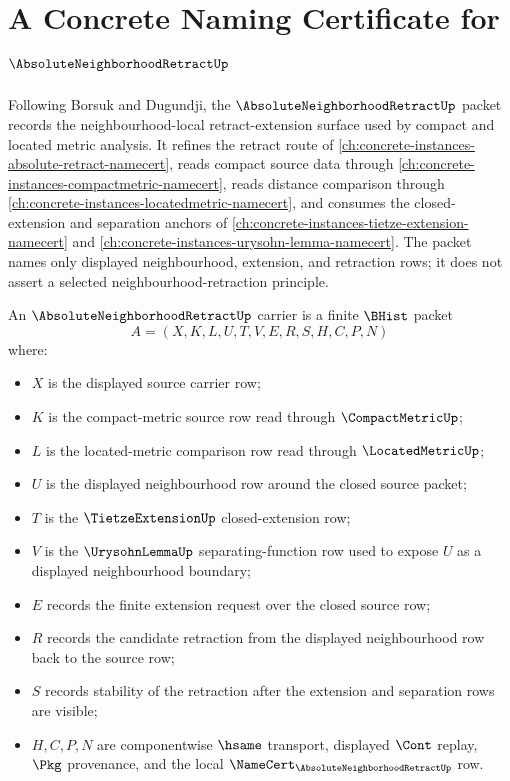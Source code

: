 \chapter{A Concrete Naming Certificate for $\AbsoluteNeighborhoodRetractUp$}
\label{ch:concrete-instances-absolute-neighborhood-retract-namecert}

Following Borsuk and Dugundji, the $\AbsoluteNeighborhoodRetractUp$ packet records the neighbourhood-local retract-extension surface used by compact and located metric analysis. It refines the retract route of \autoref{ch:concrete-instances-absolute-retract-namecert}, reads compact source data through \autoref{ch:concrete-instances-compactmetric-namecert}, reads distance comparison through \autoref{ch:concrete-instances-locatedmetric-namecert}, and consumes the closed-extension and separation anchors of \autoref{ch:concrete-instances-tietze-extension-namecert} and \autoref{ch:concrete-instances-urysohn-lemma-namecert}. The packet names only displayed neighbourhood, extension, and retraction rows; it does not assert a selected neighbourhood-retraction principle.

\begin{definition}\label{def:absolute-neighborhood-retract-carrier}
An $\AbsoluteNeighborhoodRetractUp$ carrier is a finite $\BHist$ packet
$$
A=(X,K,L,U,T,V,E,R,S,H,C,P,N)
$$
where:
\begin{itemize}
\item $X$ is the displayed source carrier row;
\item $K$ is the compact-metric source row read through $\CompactMetricUp$;
\item $L$ is the located-metric comparison row read through $\LocatedMetricUp$;
\item $U$ is the displayed neighbourhood row around the closed source packet;
\item $T$ is the $\TietzeExtensionUp$ closed-extension row;
\item $V$ is the $\UrysohnLemmaUp$ separating-function row used to expose $U$ as a displayed neighbourhood boundary;
\item $E$ records the finite extension request over the closed source row;
\item $R$ records the candidate retraction from the displayed neighbourhood row back to the source row;
\item $S$ records stability of the retraction after the extension and separation rows are visible;
\item $H,C,P,N$ are componentwise $\hsame$ transport, displayed $\Cont$ replay, $\Pkg$ provenance, and the local $\NameCert_{\AbsoluteNeighborhoodRetractUp}$ row.
\end{itemize}
\end{definition}

